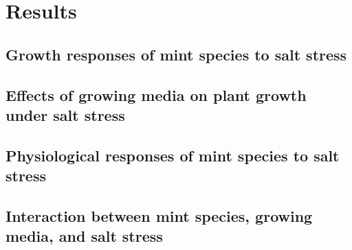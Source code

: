 \chapter{Results}

\section{Growth responses of mint species to salt stress}

\section{Effects of growing media on plant growth under salt stress}

\section{Physiological responses of mint species to salt stress}

\section{Interaction between mint species, growing media, and salt stress}
